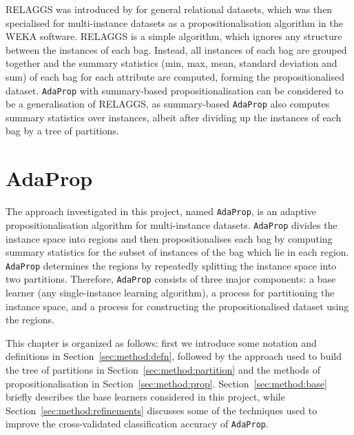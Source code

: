\documentclass[a4paper,12pt]{report} %
\newcommand{\AdaProp}{\texttt{AdaProp}\xspace}
\begin{document}
RELAGGS was introduced by  for general relational datasets,
    which was then specialised for multi-instance datasets as a propositionalisation algorithm
    in the WEKA software.
RELAGGS is a simple algorithm, which ignores any structure between the instances 
	of each bag.
Instead, all instances of each bag are grouped together and the summary statistics 
	(min, max, mean, standard deviation and sum) of each bag for each attribute
	are computed, forming the propositionalised dataset.
\AdaProp with summary-based propositionalisation can be considered to be 
	a generalisation of RELAGGS, as summary-based \AdaProp also computes summary statistics
	over instances, albeit after dividing up the instances of each bag by a tree of partitions.


\chapter{AdaProp}
\label{chap:method}

The approach investigated in this project, named \AdaProp, 
	is an adaptive propositionalisation algorithm for multi-instance datasets.
\AdaProp divides the instance space
    into regions and then propositionalises each bag 
    by computing summary statistics for the 
    subset of instances of the bag which lie in each region.
\AdaProp determines the regions by repeatedly splitting the instance space into 
    two partitions.
Therefore, \AdaProp consists of three major components: 
    a base learner (any single-instance learning algorithm),
    a process for partitioning the instance space, and 
    a process for constructing the propositionalised dataset using the regions.

This chapter is organized as follows: 
	first we introduce some notation and definitions in Section~\ref{sec:method:defn}, followed
	by the approach used to build the tree of partitions in Section~\ref{sec:method:partition} and
	the methods of propositionalisation in Section~\ref{sec:method:prop}.
Section~\ref{sec:method:base} briefly describes the base learners considered in this project, 
	while Section~\ref{sec:method:refinements} discusses some of the techniques used to improve
	the cross-validated classification accuracy of \AdaProp.
\end{document}
